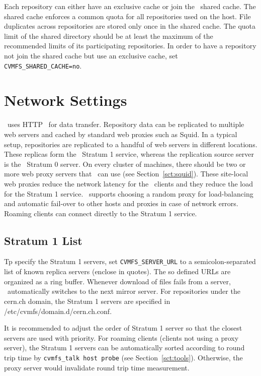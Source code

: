 Each repository can either have an exclusive cache or join the \cvmfs\ shared cache.
The shared cache enforces a common quota for all repositories used on the host.
File duplicates across repositories are stored only once in the shared cache.
The quota limit of the shared directory should be at least the maximum of the recommended limits of its participating repositories.
In order to have a repository not join the shared cache but use an exclusive cache, set \texttt{CVMFS\_SHARED\_CACHE=no}.

\section{Network Settings}
\label{sct:config:network}
\cvmfs\ uses HTTP~\cite{rfc1945,rfc2616} for data transfer.
Repository data can be replicated to multiple web servers and cached by standard web proxies such as Squid.
In a typical setup, repositories are replicated to a handful of web servers in different locations.
These replicas form the \cvmfs\ Stratum 1 service, whereas the replication source server is the \cvmfs\ Stratum 0 server.
On every cluster of machines, there should be two or more web proxy servers that \cvmfs\ can use (see Section~\ref{sct:squid}).
These site-local web proxies reduce the network latency for the \cvmfs\ clients and they reduce the load for the Stratum 1 service.
\cvmfs\ supports choosing a random proxy for load-balancing and automatic fail-over to other hosts and proxies in case of network errors.
Roaming clients can connect directly to the Stratum 1 service.

\subsection{Stratum 1 List}
Tp specify the Stratum 1 servers, set \texttt{CVMFS\_SERVER\_URL} to a semicolon-separated list of known replica servers (enclose in quotes). 
The so defined URLs are organized as a ring buffer.
Whenever download of files fails from a server, \cvmfs\ automatically switches to the next mirror server.
For repositories under the cern.ch domain, the Stratum 1 servers are specified in /etc/cvmfs/domain.d/cern.ch.conf.

It is recommended to adjust the order of Stratum 1 server so that the closest servers are used with priority.
For roaming clients (\ie clients not using a proxy server), the Stratum 1 servers can be automatically sorted according to round trip time by \texttt{cvmfs\_talk host probe} (see Section~\ref{sct:tools}).
Otherwise, the proxy server would invalidate round trip time measurement.

